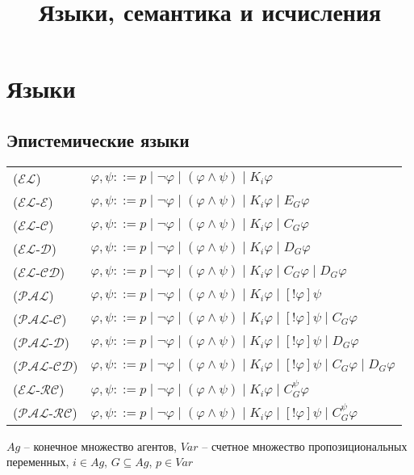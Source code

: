\documentclass[11pt]{article}
\title{Языки, семантика и исчисления}
\newcommand{\EL}{\mathcal{EL}}
\newcommand{\ELC}{\mathcal{EL\text{-}C}}
\newcommand{\ELD}{\mathcal{EL\text{-}D}}
\newcommand{\ELCD}{\mathcal{EL\text{-}CD}}
\newcommand{\ELE}{\mathcal{EL\text{-}E}}
\newcommand{\PAL}{\mathcal{PAL}}
\newcommand{\PALC}{\mathcal{PAL\text{-}C}}
\newcommand{\PALD}{\mathcal{PAL\text{-}D}}
\newcommand{\PALCD}{\mathcal{PAL\text{-}CD}}
\newcommand{\ELRC}{\mathcal{EL\text{-}RC}}
\newcommand{\PALRC}{\mathcal{PAL\text{-}RC}}
\begin{document}
\maketitle

\section{Языки}
\subsection{Эпистемические языки}
\begin{center}
\begin{tabular}{ll}
($\EL$)   &$\varphi, \psi::=   p \mid \neg \varphi \mid (\varphi \wedge \psi) \mid K_i \varphi $ \\
($\ELE$)  &$\varphi, \psi::=   p \mid \neg \varphi \mid (\varphi \wedge \psi) \mid K_i \varphi \mid E_G \varphi $ \\
($\ELC$)  &$\varphi, \psi::=   p \mid \neg \varphi \mid (\varphi \wedge \psi) \mid K_i \varphi \mid C_G \varphi$ \\
($\ELD$)  &$\varphi, \psi::=   p \mid \neg \varphi \mid (\varphi \wedge \psi) \mid K_i \varphi \mid D_G \varphi$  \\
($\ELCD$) &$\varphi, \psi::=   p \mid \neg \varphi \mid (\varphi \wedge \psi) \mid K_i \varphi \mid C_G \varphi \mid D_G \varphi$  \\
($\PAL$)  &$\varphi, \psi::=   p \mid \neg \varphi \mid (\varphi \wedge \psi) \mid K_i \varphi \mid [!\varphi]\psi$ \\
($\PALC$) & $\varphi, \psi::=   p \mid \neg \varphi \mid (\varphi \wedge \psi) \mid K_i \varphi \mid [!\varphi]\psi \mid C_G \varphi$\\
($\PALD$) & $\varphi, \psi::=   p \mid \neg \varphi \mid (\varphi \wedge \psi) \mid K_i \varphi \mid [!\varphi]\psi \mid D_G \varphi$\\
($\PALCD$)& $\varphi, \psi::=   p \mid \neg \varphi \mid (\varphi \wedge \psi) \mid K_i \varphi \mid [!\varphi]\psi \mid C_G \varphi \mid D_G \varphi$ \\
($\ELRC$) & $\varphi, \psi::=   p \mid \neg \varphi \mid (\varphi \wedge \psi) \mid K_i \varphi \mid C^\psi_G \varphi$ \\
($\PALRC$) & $\varphi, \psi::=   p \mid \neg \varphi \mid (\varphi \wedge \psi) \mid K_i \varphi \mid [!\varphi]\psi \mid C^\psi_G \varphi $
\end{tabular}
\end{center}
$Ag$ – конечное множество агентов, $Var$ – счетное множество пропозициональных переменных, 
$i \in Ag$, $G \subseteq Ag$, $p\in Var$ 
\end{document}
